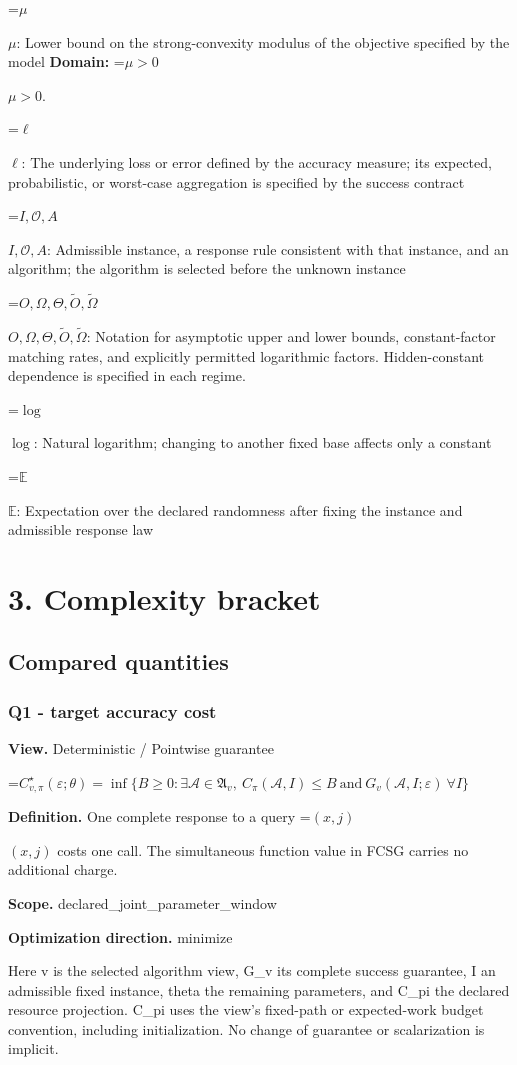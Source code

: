 \documentclass[10pt,a4paper]{article}
\newcommand{\AtlasMath}[1]{\par\begingroup\centering\setbox0=\hbox{$\displaystyle #1$}\ifdim\wd0>1.4\linewidth\typeout{ATLAS WIDE FORMULA: \the\wd0}\fi\ifdim\wd0>\linewidth\resizebox{\linewidth}{!}{\box0}\else\box0\fi\par\endgroup}
\newcommand{\AtlasInlineMath}[1]{\begingroup\setbox0=\hbox{$#1$}\ifdim\wd0>.4\linewidth\endgroup\AtlasMath{#1}\else\endgroup$#1$\fi}
\begin{document}
\AtlasInlineMath{\mu}: Lower bound on the strong-convexity modulus of the objective specified by the model \textbf{Domain:} \AtlasInlineMath{\mu>0}.

\AtlasInlineMath{\ell}: The underlying loss or error defined by the accuracy measure; its expected, probabilistic, or worst-case aggregation is specified by the success contract

\AtlasInlineMath{I,\mathcal{O},A}: Admissible instance, a response rule consistent with that instance, and an algorithm; the algorithm is selected before the unknown instance

\AtlasInlineMath{O,\Omega,\Theta,\widetilde{O},\widetilde\Omega}: Notation for asymptotic upper and lower bounds, constant-factor matching rates, and explicitly permitted logarithmic factors. Hidden-constant dependence is specified in each regime.

\AtlasInlineMath{\log}: Natural logarithm; changing to another fixed base affects only a constant

\AtlasInlineMath{\mathbb{E}}: Expectation over the declared randomness after fixing the instance and admissible response law

\section{3. Complexity bracket}
\subsection{Compared quantities}
\subsubsection{Q1 - target accuracy cost}
\textbf{View.} Deterministic / Pointwise guarantee

\AtlasMath{C^\star_{v,\pi}(\varepsilon;\theta)=\inf\{B\ge0:\exists\mathcal A\in\mathfrak A_v,\ C_\pi(\mathcal A,I)\le B\ \text{and}\ G_v(\mathcal A,I;\varepsilon)\ \forall I\}}
\textbf{Definition.} One complete response to a query \AtlasInlineMath{(x,j)} costs one call. The simultaneous function value in FCSG carries no additional charge.

\textbf{Scope.} declared\_joint\_parameter\_window

\textbf{Optimization direction.} minimize

Here v is the selected algorithm view, G\_v its complete success guarantee, I an admissible fixed instance, theta the remaining parameters, and C\_pi the declared resource projection. C\_pi uses the view's fixed-path or expected-work budget convention, including initialization. No change of guarantee or scalarization is implicit.
\end{document}
